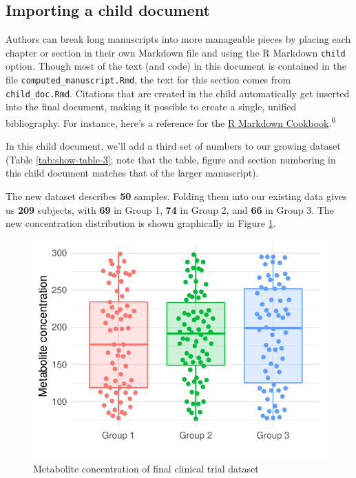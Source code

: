 \documentclass[smallextended]{svjour3}       %
\begin{document}
\hypertarget{importing-a-child-document}{%
\subsection{Importing a child document}\label{importing-a-child-document}}

Authors can break long manuscripts into more manageable pieces by placing each chapter or section in their own Markdown file and using the R Markdown \texttt{child} option. Though most of the text (and code) in this document is contained in the file \texttt{computed\_manuscript.Rmd}, the text for this section comes from \texttt{child\_doc.Rmd}. Citations that are created in the child automatically get inserted into the final document, making it possible to create a single, unified bibliography. For instance, here's a reference for the \href{https://bookdown.org/yihui/rmarkdown-cookbook/}{R Markdown Cookbook}.\textsuperscript{6}

In this child document, we'll add a third set of numbers to our growing dataset (Table \ref{tab:show-table-3}; note that the table, figure and section numbering in this child document matches that of the larger manuscript).

The new dataset describes \textbf{50} samples. Folding them into our existing data gives us \textbf{209} subjects, with \textbf{69} in Group 1, \textbf{74} in Group 2, and \textbf{66} in Group 3. The new concentration distribution is shown graphically in Figure \ref{fig:plot-data-2}.

\begin{figure}
\centering
\includegraphics{computed_manuscript_files/figure-latex/plot-data-2-1.pdf}
\caption{\label{fig:plot-data-2}Metabolite concentration of final clinical trial dataset}
\end{figure}
\end{document}
